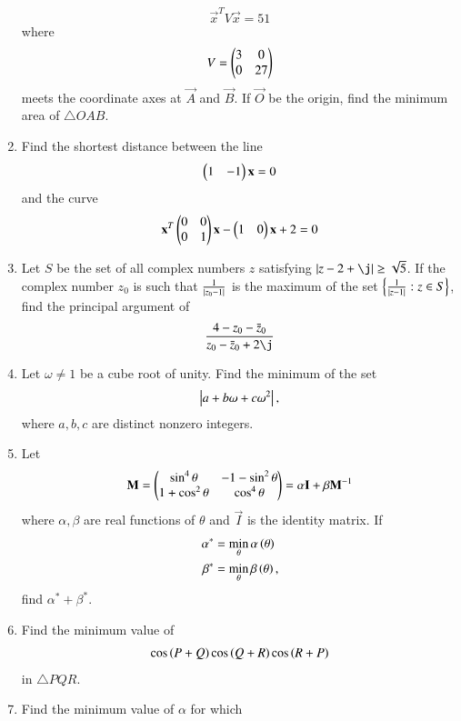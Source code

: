 \documentclass[journal,12pt,twocolumn]{IEEEtran}
\begin{document}
\begin{enumerate}[label=\arabic*.]
\begin{equation}
\vec{x}^TV\vec{x} =51
\end{equation}
%
where
\begin{equation}
V = \begin{pmatrix}3 & 0 \\ 0 & 27\end{pmatrix}
\end{equation}
%
meets the coordinate axes at  $\vec{A}$  and  $\vec{B}$.  If   $\vec{O}$  be the origin, find the minimum area 
of $\triangle OAB$.
\item Find the shortest distance between the line 
\begin{equation}
\begin{pmatrix}1 & -1 \end{pmatrix}\mathbf{x}  =0
\end{equation}
%
and the curve
\begin{equation}
\mathbf{x}^T\begin{pmatrix}0 & 0 \\ 0 & 1\end{pmatrix}\mathbf{x} - \begin{pmatrix}1 & 0\end{pmatrix}\mathbf{x} + 2 =0
\end{equation}
\item Let $S$ be the set of all complex numbers $z$ satisfying $\abs{z-2+\j} \ge \sqrt{5}$. If the complex number $z_0$ is such that $\frac{1}{\left\vert z_0-1\right\vert}$ is the maximum of the set $\left\{\frac{1}{\left\vert z-1\right\vert}: z \in S\right\}$, find the principal argument of 
\begin{align}
\frac{4-z_0-\bar{z}_0}{z_0-\bar{z}_0+2\j}
\end{align}
\item Let $\omega \ne 1$ be a cube root of unity. Find the minimum of the set
\begin{align}
\left\vert a+b\omega+c\omega^2\right\vert, 
\end{align}
%
where $a,b,c$ are distinct nonzero integers.
\item Let 
\begin{align}
\label{eq:mat_def}
\mathbf{M} = \begin{pmatrix}\sin^4\theta & -1-\sin^2\theta \\ 1+ \cos^2\theta & \cos^4\theta\end{pmatrix} = \alpha\mathbf{I} + \beta \mathbf{M}^{-1}
\end{align}
where $\alpha, \beta$ are real functions of $\theta$ and $\vec{I}$ is the identity matrix. If 
\begin{align}
\alpha^{*} &= \min_{\theta}\alpha\left(\theta\right)
\\
\beta^{*} &= \min_{\theta}\beta\left(\theta\right), 
\end{align}
find $\alpha^{*} + \beta^{*}$.
\item Find the minimum value of 
\begin{align}
\cos \left(P+Q\right)
\cos \left(Q+R\right)
\cos \left(R+P\right)
\end{align}
%
in $\triangle PQR$.
\item Find the minimum value of $\alpha$ for which 

\end{enumerate}
\end{document}
